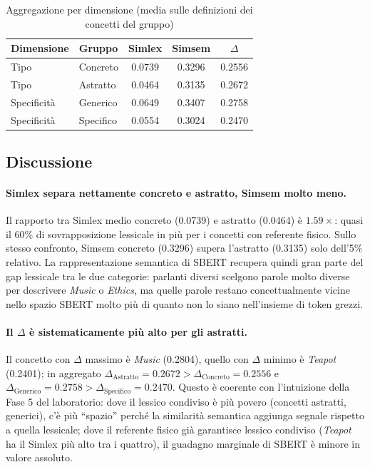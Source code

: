 \documentclass[12pt,a4paper]{article}
\begin{document}
\begin{table}[H]
  \centering
  \caption{Aggregazione per dimensione (media sulle definizioni dei concetti del gruppo)}
  \begin{tabular}{llccc}
    \toprule
    \textbf{Dimensione} & \textbf{Gruppo} & \textbf{Simlex} & \textbf{Simsem} & \textbf{$\Delta$} \\
    \midrule
    Tipo          & Concreto  & 0.0739 & 0.3296 & 0.2556 \\
    Tipo          & Astratto  & 0.0464 & 0.3135 & 0.2672 \\
    Specificit\`a & Generico  & 0.0649 & 0.3407 & 0.2758 \\
    Specificit\`a & Specifico & 0.0554 & 0.3024 & 0.2470 \\
    \bottomrule
  \end{tabular}
\end{table}

\subsection{Discussione}

\paragraph{Simlex separa nettamente concreto e astratto, Simsem molto meno.} Il rapporto tra Simlex medio concreto (0.0739) e astratto (0.0464) \`e $1.59\times$: quasi il 60\% di sovrapposizione lessicale in pi\`u per i concetti con referente fisico. Sullo stesso confronto, Simsem concreto (0.3296) supera l'astratto (0.3135) solo dell'5\% relativo. La rappresentazione semantica di SBERT recupera quindi gran parte del gap lessicale tra le due categorie: parlanti diversi scelgono parole molto diverse per descrivere \textit{Music} o \textit{Ethics}, ma quelle parole restano concettualmente vicine nello spazio SBERT molto pi\`u di quanto non lo siano nell'insieme di token grezzi.

\paragraph{Il $\Delta$ \`e sistematicamente pi\`u alto per gli astratti.} Il concetto con $\Delta$ massimo \`e \textit{Music} (0.2804), quello con $\Delta$ minimo \`e \textit{Teapot} (0.2401); in aggregato $\Delta_{\text{Astratto}}=0.2672 > \Delta_{\text{Concreto}}=0.2556$ e $\Delta_{\text{Generico}}=0.2758 > \Delta_{\text{Specifico}}=0.2470$. Questo \`e coerente con l'intuizione della Fase 5 del laboratorio: dove il lessico condiviso \`e pi\`u povero (concetti astratti, generici), c'\`e pi\`u ``spazio'' perch\'e la similarit\`a semantica aggiunga segnale rispetto a quella lessicale; dove il referente fisico gi\`a garantisce lessico condiviso (\textit{Teapot} ha il Simlex pi\`u alto tra i quattro), il guadagno marginale di SBERT \`e minore in valore assoluto.
\end{document}
